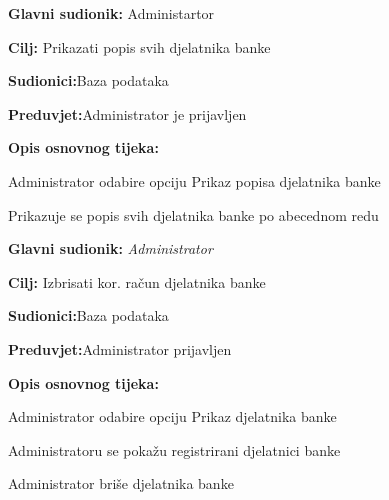 \documentclass[11pt]{book}
\begin{document}
\noindent {}
\begin{packed_item}
	
	\item \textbf{Glavni sudionik: }{Administartor}
	\item  \textbf{Cilj:} {Prikazati popis svih djelatnika banke}
	\item  \textbf{Sudionici:}{Baza podataka} 
	\item  \textbf{Preduvjet:}{Administrator je prijavljen}
	\item  \textbf{Opis osnovnog tijeka:}
	
	\item[] \begin{packed_enum}
		
		\item {Administrator odabire opciju Prikaz popisa djelatnika banke}
		\item {Prikazuje se popis svih djelatnika banke po abecednom redu}
		\end{packed_enum}
\end{packed_item}
\noindent {}
\begin{packed_item}
	
	\item \textbf{Glavni sudionik: }\textit{Administrator}
	\item  \textbf{Cilj:} {Izbrisati kor. račun djelatnika banke}
	\item  \textbf{Sudionici:}{Baza podataka}
	\item  \textbf{Preduvjet:}{Administrator prijavljen}
	\item  \textbf{Opis osnovnog tijeka:}
	
	\item[] \begin{packed_enum}
		
		\item {Administrator odabire opciju Prikaz djelatnika banke}
		\item {Administratoru se pokažu registrirani djelatnici banke}
		\item {Administrator briše djelatnika banke}
		
	\end{packed_enum}
	
\end{packed_item}
\end{document}

